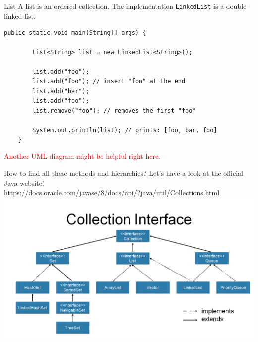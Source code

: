 \begin{frame}[fragile]{List}
	A list is an ordered collection.
	\vfill
	The implementation \texttt{LinkedList} is a double-linked list.
	\begin{lstlisting}[basicstyle=\ttfamily\scriptsize]
	public static void main(String[] args) {
	
	    List<String> list = new LinkedList<String>();
	    
	    list.add("foo"); 
	    list.add("foo"); // insert "foo" at the end
	    list.add("bar");
	    list.add("foo");
	    list.remove("foo"); // removes the first "foo"
	    
	    System.out.println(list); // prints: [foo, bar, foo]
	}
	\end{lstlisting}
	\textcolor{red}{Another UML diagram might be helpful right here.}\\
\end{frame}

\begin{frame}[fragile]{How to find all these methods and hierarchies?}
	Let's have a look at the official Java website! \\
	https://docs.oracle.com/javase/8/docs/api/?java/util/Collections.html\\
	\pause
	\includegraphics[width=\textwidth]{class-and-interface-hierarchy.png}
\end{frame}
	
